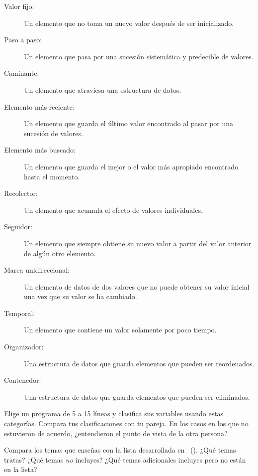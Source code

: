 \begin{description}

\item[Valor fijo:]
  Un elemento que no toma un nuevo valor después de ser inicializado.

\item[Paso a paso:]
  Un elemento que pasa por una sucesión sistemática y predecible de valores.

\item[Caminante:]
  Un elemento que atraviesa una estructura de datos.

\item[Elemento más reciente:]
  Un elemento que guarda el último valor encontrado
  al pasar por una sucesión de valores.

\item[Elemento más buscado:]
  Un elemento que guarda el mejor o el valor más apropiado encontrado hasta el momento.

\item[Recolector:]
  Un elemento que acumula el efecto de valores individuales.

\item[Seguidor:]
  Un elemento que siempre obtiene su nuevo valor a partir del valor anterior de algún otro elemento.

\item[Marca unidireccional:]
  Un elemento de datos de dos valores que no puede obtener su valor inicial una vez que su valor se ha cambiado.

\item[Temporal:]
  Un elemento que contiene un valor solamente por poco tiempo.

\item[Organizador:]
  Una estructura de datos que guarda elementos que pueden ser reordenados.

\item[Contenedor:]
  Una estructura de datos que guarda elementos que pueden ser eliminados.

\end{description}

Elige un programa de 5 a 15 líneas y clasifica sus variables usando estas categorías.
Compara tus clasificaciones con tu pareja.
En los casos en los que no estuvieron de acuerdo,
¿entendieron el punto de vista de la otra persona?


Compara los temas que enseñas con la lista desarrollada en~\cite{Luxt2017} ().
¿Qué temas tratas?
¿Qué temas \emph{no} incluyes?
¿Qué temas adicionales incluyes pero no están en la lista?

